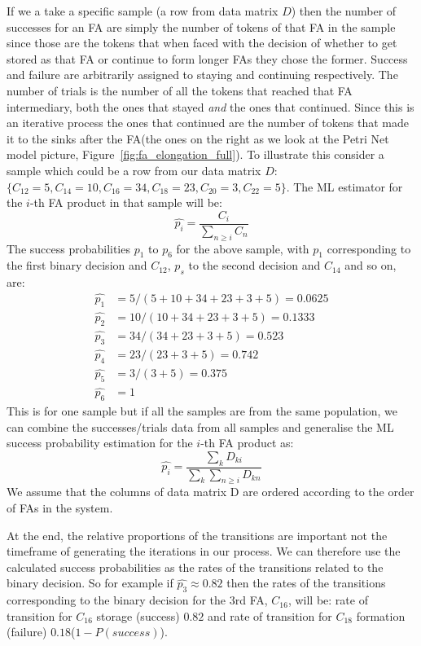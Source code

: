 If we a take a specific sample (a row from data matrix $D$) then the
number of successes for an FA are simply the number of tokens of
that FA in the sample since those are the tokens that when faced with
the decision of whether to get stored as that FA or continue to form
longer FAs they chose the former. Success and failure are arbitrarily
assigned to staying and continuing respectively. The number of trials
is the number of all the tokens that reached that FA intermediary, both
the ones that stayed \textit{and} the ones that continued. Since this
is an iterative process the ones that continued are the number of
tokens that made it to the sinks after the FA(the ones on the right as
we look at the Petri Net model picture,
Figure~\ref{fig:fa_elongation_full}). To illustrate this consider a
sample which could be a row from our data matrix $D$: $\{C_{12}=5,
C_{14}=10, C_{16}=34, C_{18}=23, C_{20}=3, C_{22}=5\}$. The ML
estimator for the $i$-th FA product in that sample will be:
\begin{equation*}
\hat{p_i} = \frac{C_i}{\sum_{n \geq i} C_n}
\end{equation*}
The success probabilities $p_1$ to $p_6$ for the above sample, with $p_1$ corresponding to
the first binary decision and $C_{12}$, $p_s$ to the second decision
and $C_{14}$ and so on, are:
\begin{align*}
\hat{p_1} & = 5/(5+10+34+23+3+5) = 0.0625\\
\hat{p_2} & = 10 / (10+34+23+3+5) = 0.1333\\
\hat{p_3} & = 34 / (34+23+3+5) = 0.523\\
\hat{p_4} & = 23 / (23+3+5) = 0.742\\
\hat{p_5} & = 3 / (3+5) = 0.375\\
\hat{p_6} & = 1
\end{align*}
This is for one sample but if all the samples are from the same
population, we can combine the successes/trials data from all
samples and generalise the ML success probability estimation for the
$i$-th FA product as:
\begin{equation*}
\hat{p_i} = \frac{\sum_k D_{ki}}{\sum_k \sum_{n\geq i} D_{kn}}
\end{equation*}
We assume that the columns of data matrix D are ordered according to
the order of FAs in the system.

At the end, the relative proportions of the transitions are important not the timeframe of generating the iterations in our process. We can therefore
use the calculated success probabilities as the rates of the
transitions related to the binary decision. So for example if
$\hat{p_3}\approx0.82$ then the rates of the transitions corresponding to the
binary decision for the 3rd FA, $C_{16}$, will be: rate of transition
for $C_{16}$ storage (success) $0.82$ and rate of transition for
$C_{18}$ formation (failure) $0.18$($1-P(success)$).


